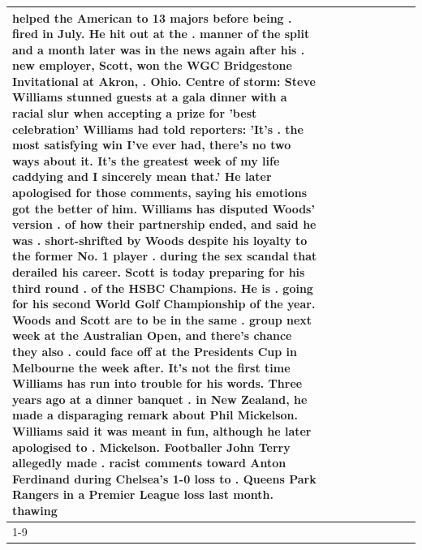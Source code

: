 \begin{table}[H]
\begin{tabular}{lllrlllll}
helped the American to 13 majors before being . fired in July. He hit out at the . manner of the split and a month later was in the news again after his . new employer, Scott, won the WGC Bridgestone Invitational at Akron, . Ohio. Centre of storm: Steve Williams stunned guests at a gala dinner with a racial slur when accepting a prize for 'best celebration' Williams had told reporters: 'It's . the most satisfying win I've ever had, there's no two ways about it. It's the greatest week of my life caddying and I sincerely mean that.' He later apologised for those comments, saying his emotions got the better of him. Williams has disputed Woods' version . of how their partnership ended, and said he was . short-shrifted by Woods despite his loyalty to the former No. 1 player . during the sex scandal that derailed his career. Scott is today preparing for his third round . of the HSBC Champions. He is . going for his second World Golf Championship of the year. Woods and Scott are to be in the same . group next week at the Australian Open, and there's chance they also . could face off at the Presidents Cup in Melbourne the week after. It's not the first time Williams has run into trouble for his words. Three years ago at a dinner banquet . in New Zealand, he made a disparaging remark about Phil Mickelson. Williams said it was meant in fun, although he later apologised to . Mickelson. Footballer John Terry allegedly made . racist comments toward Anton Ferdinand during Chelsea's 1-0 loss to . Queens Park Rangers in a Premier League loss last month. thawing \\
\cline{1-9}

\end{tabular}
\end{table}
